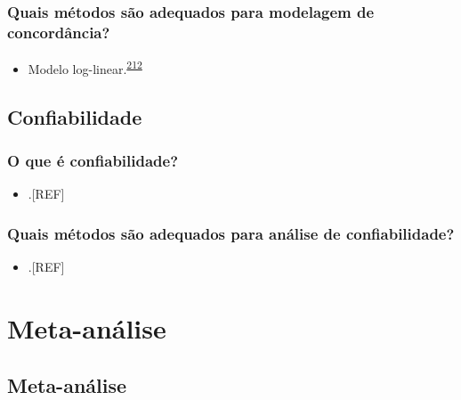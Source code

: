 \documentclass[
  a4paper,
]{book}
\providecommand{\tightlist}{%
  \setlength{\itemsep}{0pt}\setlength{\parskip}{0pt}}
\begin{document}
\hypertarget{quais-muxe9todos-suxe3o-adequados-para-modelagem-de-concorduxe2ncia}{%
\subsection{Quais métodos são adequados para modelagem de concordância?}\label{quais-muxe9todos-suxe3o-adequados-para-modelagem-de-concorduxe2ncia}}

\begin{itemize}
\tightlist
\item
  Modelo log-linear.\textsuperscript{\protect\hyperlink{ref-banerjee1999}{212}}
\end{itemize}

\hypertarget{confiabilidade}{%
\section{Confiabilidade}\label{confiabilidade}}

\hypertarget{o-que-uxe9-confiabilidade}{%
\subsection{O que é confiabilidade?}\label{o-que-uxe9-confiabilidade}}

\begin{itemize}
\tightlist
\item
  .{[}REF{]}
\end{itemize}

\hypertarget{quais-muxe9todos-suxe3o-adequados-para-anuxe1lise-de-confiabilidade}{%
\subsection{Quais métodos são adequados para análise de confiabilidade?}\label{quais-muxe9todos-suxe3o-adequados-para-anuxe1lise-de-confiabilidade}}

\begin{itemize}
\tightlist
\item
  .{[}REF{]}
\end{itemize}

\hypertarget{meta-analise}{%
\chapter{\texorpdfstring{\textbf{Meta-análise}}{Meta-análise}}\label{meta-analise}}

\hypertarget{meta-analise}{%
\section{Meta-análise}\label{meta-analise}}
\end{document}

